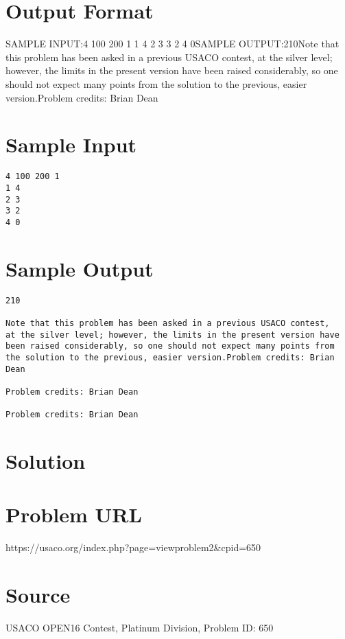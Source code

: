 \documentclass[12pt]{article}
\begin{document}
\section*{Output Format}
SAMPLE INPUT:4 100 200 1
1 4
2 3
3 2
4 0SAMPLE OUTPUT:210Note that this problem has been asked in a previous USACO contest,
at the silver level; however, the limits in the present version have
been raised considerably, so one should not expect many points from
the solution to the previous, easier version.Problem credits: Brian Dean

\section*{Sample Input}
\begin{verbatim}
4 100 200 1
1 4
2 3
3 2
4 0
\end{verbatim}

\section*{Sample Output}
\begin{verbatim}
210

Note that this problem has been asked in a previous USACO contest,
at the silver level; however, the limits in the present version have
been raised considerably, so one should not expect many points from
the solution to the previous, easier version.Problem credits: Brian Dean

Problem credits: Brian Dean

Problem credits: Brian Dean
\end{verbatim}

\section*{Solution}


\section*{Problem URL}
https://usaco.org/index.php?page=viewproblem2&cpid=650

\section*{Source}
USACO OPEN16 Contest, Platinum Division, Problem ID: 650
\end{document}

